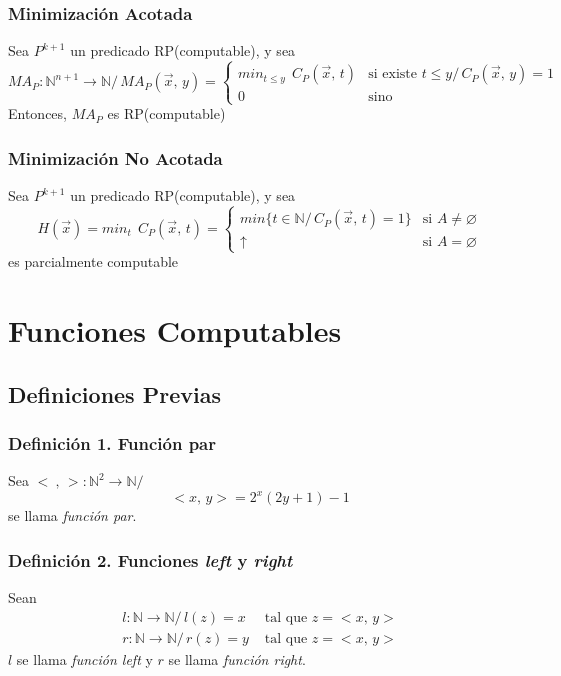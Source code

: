 \documentclass{article}
\newcommand{\comma}{,\,}                                %
\newcommand{\tq}{/\,}                                   %
\newcommand{\naturales}{\mathbb{N}}                     %
\begin{document}
\subsubsection{Minimización Acotada}
Sea $P^{k+1}$ un predicado RP(computable), y sea 
\begin{equation*}
    MA_P: \naturales^{n+1} \rightarrow \naturales \tq MA_P(\Vec{x} \comma y) = \begin{cases}
    min_{t \leq y} \:\: C_P(\Vec{x} \comma t) &\text{si existe } t \leq y \tq C_P(\Vec{x} \comma y) = 1\\
    0 &\text{sino}
    \end{cases}
\end{equation*}
Entonces, $MA_P$ es RP(computable)

\subsubsection{Minimización No Acotada}
Sea $P^{k+1}$ un predicado RP(computable), y sea 
\begin{equation*}
    H(\Vec{x}) = min_t \:\: C_P(\Vec{x} \comma t) = \begin{cases}
    min\{t \in \naturales \tq C_P(\Vec{x} \comma t) = 1\} &\text{si } A \neq \varnothing \\
    \uparrow &\text{si } A = \varnothing
    \end{cases}
\end{equation*}
es parcialmente computable

\newpage
\section{Funciones Computables}
\subsection{Definiciones Previas}
\subsubsection*{Definición 1. Función par}
Sea $< \:\comma >: \naturales^2 \rightarrow \naturales \tq$
\begin{equation*}
    <x \comma y> = 2^x (2y + 1) - 1
\end{equation*}
se llama \emph{función par}.

\subsubsection*{Definición 2. Funciones \emph{left} y \emph{right}}
Sean 
\begin{align*}
    l: \naturales \rightarrow \naturales \tq l(z) = x &\text{ tal que } z = < x \comma y > \\
    r: \naturales \rightarrow \naturales \tq r(z) = y &\text{ tal que } z = < x \comma y >
\end{align*}
$l$ se llama \emph{función left} y $r$ se llama \emph{función right}.
\end{document}

